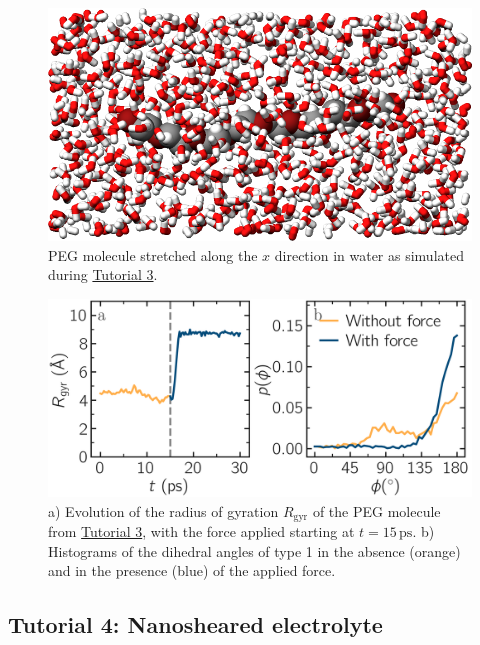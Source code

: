\documentclass[9pt,tutorial]{livecoms}
\begin{document}
\begin{figure}
\centering
\includegraphics[width=\linewidth]{PEG-in-water}
\caption{PEG molecule stretched along the $x$ direction in water
as simulated during \hyperref[all-atom-label]{Tutorial 3}.}
\label{fig:PEG-in-water}
\end{figure}

\begin{figure}
\centering
\includegraphics[width=\linewidth]{PEG-distance}
\caption{a) Evolution of
the radius of gyration $R_\text{gyr}$ of the PEG molecule
from \hyperref[all-atom-label]{Tutorial 3}, with the force
applied starting at $t = 15\,\text{ps}$.  b) Histograms of the dihedral angles of type 1
in the absence (orange) and in the presence (blue) of the applied force.}
\label{fig:PEG-distance}
\end{figure}

\subsection{Tutorial 4: Nanosheared electrolyte}
\label{sheared-confined-label}
\end{document}
